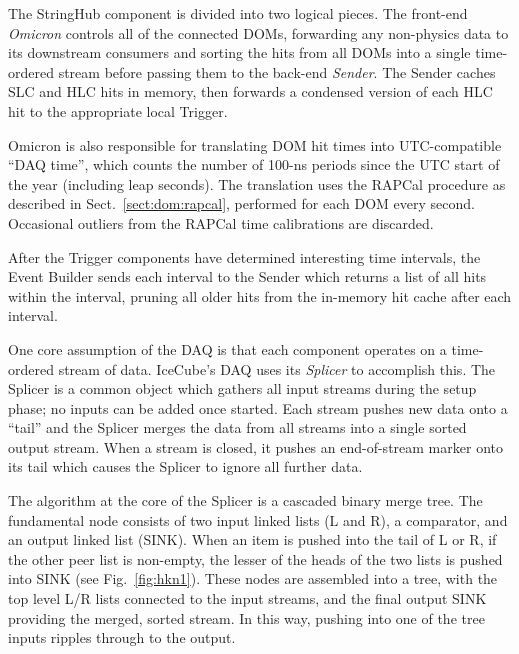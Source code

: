 The StringHub component is divided into two logical pieces.  The front-end
\emph{Omicron} controls all of the connected DOMs, forwarding any
non-physics data to its downstream consumers and sorting the hits from all
DOMs into a single time-ordered stream
before passing them to the back-end \emph{Sender}.  The Sender
caches SLC and HLC hits in memory, then forwards a condensed version of
each HLC hit to the appropriate local Trigger.

Omicron is also responsible for translating DOM hit times into
UTC-compatible ``DAQ time'', which counts the number of 100-ns periods
since the UTC start of the year (including leap seconds).  The translation
uses the RAPCal procedure as described in Sect.~\ref{sect:dom:rapcal},
performed for each DOM every second. Occasional outliers from the RAPCal time
calibrations are discarded.


After the Trigger components have determined interesting time intervals, the
Event Builder sends each interval to the Sender which returns a list
of all hits within the interval, pruning all older
hits from the in-memory hit cache after each interval.


One core assumption of the DAQ is that each component operates on a
time-ordered stream of data.  IceCube's DAQ uses its \emph{Splicer} to
accomplish this.  The Splicer is a common object which gathers all input
streams during the setup phase; no inputs can be added once started.  Each
stream pushes new data onto a ``tail'' and the Splicer merges
the data from all streams into a single sorted output stream.  When a
stream is closed, it pushes an end-of-stream marker onto its tail which causes
the Splicer to ignore all further data.

The algorithm at the core of the Splicer is a cascaded binary merge tree.
The fundamental node consists of two input linked lists (L and R), a
comparator, and an output linked list (SINK). When an item is pushed into
the tail of L or R, if the other peer list is non-empty, the lesser of the heads of
the two lists is pushed into SINK (see Fig.~\ref{fig:hkn1}).  These nodes are
assembled into a tree, with the top level L/R lists connected to the input
streams, and the final output SINK providing the merged, sorted stream.
In this way, pushing into one of the tree inputs ripples through to the output.

